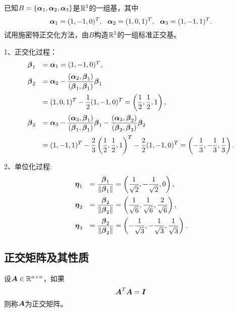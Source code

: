 \begin{frame}[allowframebreaks]\ft{\subsecname}

\begin{li}
  已知$B=\{\boldsymbol{\alpha}_1,\boldsymbol{\alpha}_2,\boldsymbol{\alpha}_3\}$是$\mathbb R^3$的一组基，其中
  $$
  \boldsymbol{\alpha}_1=(1,-1,0)^T,~~
  \boldsymbol{\alpha}_2=(1,0,1)^T,~~
  \boldsymbol{\alpha}_3=(1,-1,1)^T.
  $$
  试用施密特正交化方法，由$B$构造$\mathbb R^3$的一组标准正交基。
\end{li}
\end{frame}


\begin{frame}[allowframebreaks]\ft{\subsecname}

  \begin{jie}
    1、正交化过程：
$$
\begin{array}{rl}
  \boldsymbol{\beta}_1&=\boldsymbol{\alpha}_1=(1,-1,0)^T, \\[0.2cm]
  \boldsymbol{\beta}_2&\displaystyle=\boldsymbol{\alpha}_2-\frac{(\boldsymbol{\alpha}_2,\boldsymbol{\beta}_1)}{(\boldsymbol{\beta}_1,\boldsymbol{\beta}_1)}\boldsymbol{\beta}_1\\[0.4cm]
           &\displaystyle=(1,0,1)^T-\frac12(1,-1,0)^T=\left(\frac12,\frac12,1\right),\\[0.4cm]
  \boldsymbol{\beta}_3&\displaystyle=\boldsymbol{\alpha}_3-\frac{(\boldsymbol{\alpha}_3,\boldsymbol{\beta}_1)}{(\boldsymbol{\beta}_1,\boldsymbol{\beta}_1)}\boldsymbol{\beta}_1
             -\frac{(\boldsymbol{\alpha}_3,\boldsymbol{\beta}_2)}{(\boldsymbol{\beta}_2,\boldsymbol{\beta}_2)}\boldsymbol{\beta}_2\\[0.4cm]
           &\displaystyle=(1,-1,1)^T-\frac23\left(\frac12,\frac12,1\right)^T-\frac22(1,-1,0)^T=\left(-\frac13,-\frac13,\frac13\right).
\end{array}
$$


2、单位化过程:
$$
\begin{array}{rl}
  \boldsymbol{\eta}_1&\displaystyle =\frac{\boldsymbol{\beta}_1}{\|\boldsymbol{\beta}_1\|}=\left(\frac1{\sqrt{2}},-\frac1{\sqrt{2}},0\right),\\[0.4cm]
  \boldsymbol{\eta}_2&\displaystyle =\frac{\boldsymbol{\beta}_2}{\|\boldsymbol{\beta}_2\|}=\left(\frac1{\sqrt{6}},\frac1{\sqrt{6}},\frac2{\sqrt{6}}\right),\\[0.4cm]
  \boldsymbol{\eta}_3&\displaystyle =\frac{\boldsymbol{\beta}_2}{\|\boldsymbol{\beta}_2\|}=\left(-\frac1{\sqrt{3}},-\frac1{\sqrt{3}},\frac1{\sqrt{3}}\right).
\end{array}
$$
\end{jie}

\end{frame}


\subsection{正交矩阵及其性质}

\begin{frame}\ft{\subsecname}
\begin{dingyi}
  设$\boldsymbol{A}\in\mathbb R^{n\times n}$，如果
  $$
  \boldsymbol{A}^T\boldsymbol{A}=\boldsymbol{I}
  $$
  则称$\boldsymbol{A}$为正交矩阵。
\end{dingyi}
\end{frame}

